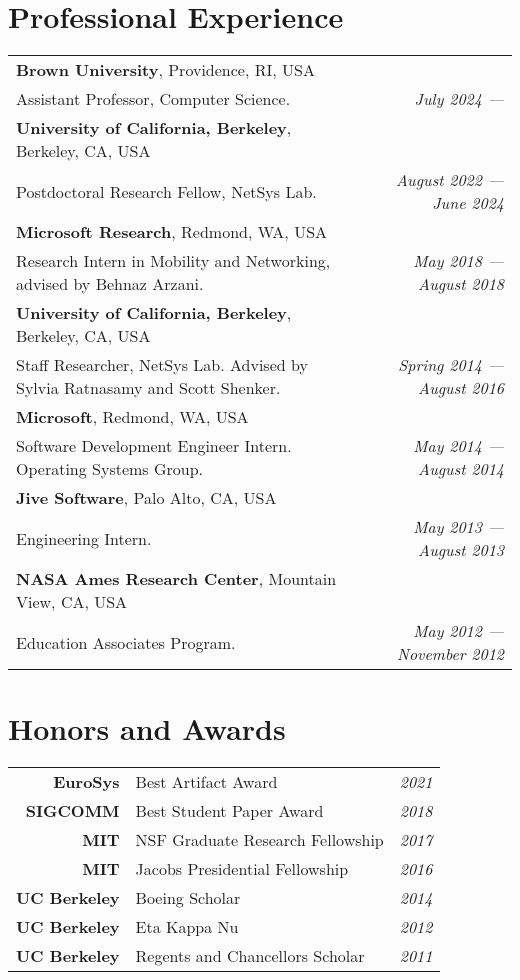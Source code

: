 \section{Professional Experience}
\begin{tabular*}{\textwidth}{@{\hspace{1cm}}l@{\extracolsep{\fill}}r@{}}
\textbf{Brown University}, Providence, RI, USA  &\\
Assistant Professor, Computer Science. & \emph{July 2024 ---} \\
%
\noindent \textbf{University of California, Berkeley}, Berkeley, CA, USA &\\
Postdoctoral Research Fellow, NetSys Lab. & \emph{August 2022 --- June 2024} \\
%
\textbf{Microsoft Research}, Redmond, WA, USA &\\
Research Intern in Mobility and Networking, advised by Behnaz Arzani. & \emph{May 2018 --- August 2018} \\
%
\textbf{University of California, Berkeley}, Berkeley, CA, USA &\\
Staff Researcher, NetSys Lab. Advised by Sylvia Ratnasamy and Scott Shenker. & \emph{Spring 2014 --- August 2016}\\
%
\textbf{Microsoft}, Redmond, WA, USA &\\
Software Development Engineer Intern. Operating Systems Group. & \emph{May 2014 --- August 2014}\\
%
\textbf{Jive Software}, Palo Alto, CA, USA &\\
Engineering Intern. & \emph{May 2013 --- August 2013}\\
%
\textbf{NASA Ames Research Center}, Mountain View, CA, USA &\\
Education Associates Program. & \emph{May 2012 --- November 2012}\\
\end{tabular*}

\section{Honors and Awards}
\begin{tabular*}{\textwidth}{@{\hspace{1cm}}r@{\hspace{5pt}}l@{\extracolsep{\fill}}r@{}}
\textbf{EuroSys}     & Best Artifact Award              & \emph{2021} \\
\textbf{SIGCOMM}     & Best Student Paper Award         & \emph{2018} \\
\textbf{MIT}         & NSF Graduate Research Fellowship & \emph{2017} \\
\textbf{MIT}         & Jacobs Presidential Fellowship   & \emph{2016} \\
\textbf{UC Berkeley} & Boeing Scholar                   & \emph{2014} \\
\textbf{UC Berkeley} & Eta Kappa Nu                     & \emph{2012} \\
\textbf{UC Berkeley} & Regents and Chancellors Scholar  & \emph{2011} \\
\end{tabular*}
